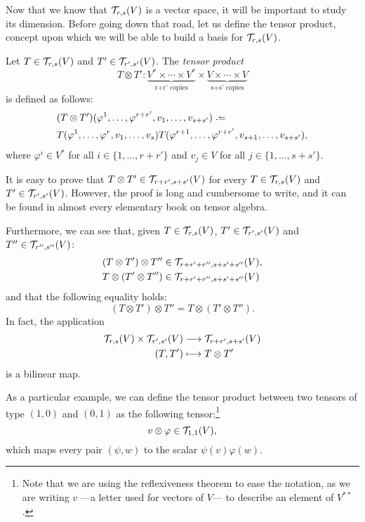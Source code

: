 Now that we know that ${\mathcal T}_{r,s}(V)$ is a vector space, it will be important to study its dimension. Before going down that road, let us define the tensor product, concept upon which we will be able to build a basis for ${\mathcal T}_{r,s}(V)$.

\begin{definition}
	Let $T \in {\mathcal T}_{r,s}(V)$ and $T' \in {\mathcal T}_{r',s'}(V)$. The \emph{tensor product} \[T \otimes T' \colon \underbrace{V^* \times \cdots \times V^*}_{\text{r+r' copies}} \times \underbrace{V \times \cdots \times V}_{\text{s+s' copies}}\] is defined as follows:
	\begin{align*}
		&(T \otimes T')(\varphi^1, \dots, \varphi^{r+r'}, v_1, \dots, v_{s+s'}) \defeq \\
		&T(\varphi^1, \dots, \varphi^r, v_1, \dots, v_s) T(\varphi^{r+1}, \dots, \varphi^{r+r'}, v_{s+1}, \dots, v_{s+s'}),
	\end{align*}
	where $\varphi^i \in V^*$ for all $i \in \{1,\dots,r+r'\}$ and $v_j \in V$ for all $j \in \{1,\dots,s+s'\}$.
\end{definition}

It is easy to prove that $T \otimes T' \in {\mathcal T}_{r+r',s+s'}(V)$ for every $T \in {\mathcal T}_{r,s}(V)$ and $T' \in {\mathcal T}_{r',s'}(V)$. However, the proof is long and cumbersome to write, and it can be found in almost every elementary book on tensor algebra.

Furthermore, we can see that, given $T \in {\mathcal T}_{r,s}(V)$, $T' \in {\mathcal T}_{r',s'}(V)$ and $T'' \in {\mathcal T}_{r'',s''}(V)$:
\begin{align*}
	(T \otimes T') \otimes T'' &\in {\mathcal T}_{r+r'+r'', s+s'+s''}(V),\\
	T \otimes (T' \otimes T'') &\in {\mathcal T}_{r+r'+r'', s+s'+s''}(V)
\end{align*}
and that the following equality holds:
\[
	(T \otimes T') \otimes T'' = T \otimes (T' \otimes T'').
\]
In fact, the application
\begin{align*}
	{\mathcal T}_{r,s}(V) \times {\mathcal T}_{r',s'}(V) &\longrightarrow {\mathcal T}_{r+r',s+s'}(V) \\
	(T,T') &\longmapsto T \otimes T'
\end{align*}
is a bilinear map.

As a particular example, we can define the tensor product between two tensors of type $(1,0)$ and $(0,1)$ as the following tensor:\footnote{Note that we are using the reflexiveness theorem to ease the notation, as we are writing $v$ ---a letter used for vectors of $V$--- to describe an element of $V^{**}$.}
\[
	v \otimes \varphi \in {\mathcal T}_{1,1}(V),
\]
which maps every pair $(\psi, w)$ to the scalar $\psi(v)\varphi(w)$.


